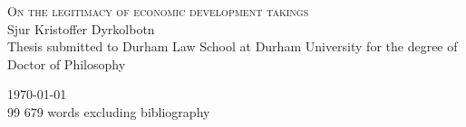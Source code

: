 \begin{titlepage}

\begin{center}



\vspace*{\fill}
\centering

{\Huge\textsc{On the legitimacy of economic development takings}}\\[3cm]


{\huge Sjur Kristoffer Dyrkolbotn}\\

\large {Thesis submitted to Durham Law School at Durham University for the degree of Doctor of Philosophy} \\

\vspace*{\fill}

 

\vfill

{\Large \today}\\
{99 679 words excluding bibliography}

\end{center}

\end{titlepage}
